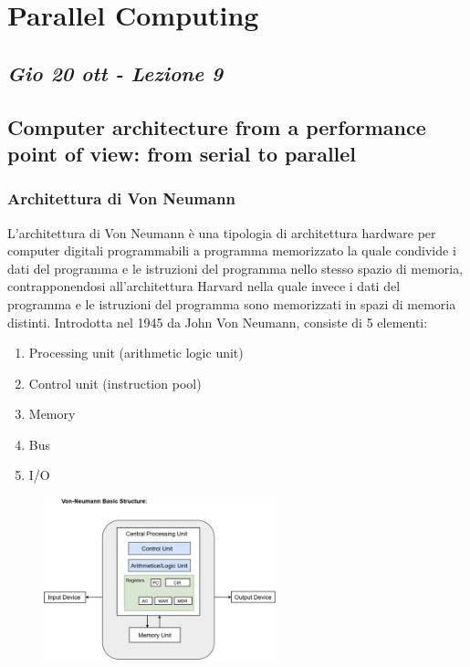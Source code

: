 \chapter{Parallel Computing}


\section{\textit{Gio 20 ott - Lezione 9}}
\section{Computer architecture from a
performance point of view: from
serial to parallel}

\subsection{Architettura di Von Neumann}
L'architettura di Von Neumann è una tipologia di architettura hardware per computer digitali programmabili a programma memorizzato la quale condivide i dati del programma e le istruzioni del programma nello stesso spazio di memoria, contrapponendosi all'architettura Harvard nella quale invece i dati del programma e le istruzioni del programma sono memorizzati in spazi di memoria distinti. 
Introdotta nel 1945 da John Von
Neumann, consiste di 5 elementi:
\begin{enumerate}
    \item Processing unit (arithmetic logic
unit)
    \item Control unit (instruction pool)
    \item Memory
    \item Bus
    \item I/O
\end{enumerate}

\begin{figure}[ht]
    \centering
    \includegraphics[width=0.6\textwidth]{figure_parallel/VN_arch.png}
\end{figure}
\FloatBarrier


